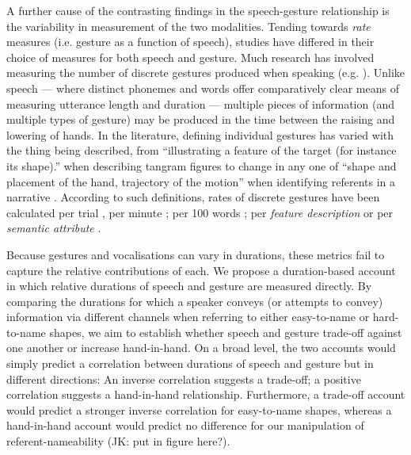 \documentclass[a4paper,man,natbib]{apa6}
\newcommand*{\term}[1]{\emph{#1}} %
\begin{document}
A further cause of the contrasting findings in the speech-gesture relationship is the variability in measurement of the two modalities.
Tending towards \term{rate} measures (i.e. gesture as a function of speech), studies have differed in their choice of measures for both speech and gesture.
Much research has involved measuring the number of discrete gestures produced when speaking (e.g. \citet{Hostetter2007, Gerwing2011, DeRuiter2012, Hoetjes2015}).
Unlike speech --- where distinct phonemes and words offer comparatively clear means of measuring utterance length and duration --- multiple pieces of information (and multiple types of gesture) may be produced in the time between the raising and lowering of hands.
In the literature, defining individual gestures has varied with the thing being described, from ``illustrating a feature of the target (for instance its shape).'' when describing tangram figures \citep{DeRuiter2012} to change in any one of ``shape and placement of the hand, trajectory of the motion'' when identifying referents in a narrative \citep{So2009}.
According to such definitions, rates of discrete gestures have been calculated per trial \citep{Morsella2004}, per minute \citep{Mol2011}; per 100 words \citep{Masson-Carro2015, Hostetter2007, Gerwing2011, Hoetjes2015}; per \term{feature description} \citep{DeRuiter2012} or per \term{semantic attribute} \citep{Hoetjes2015}.

Because gestures and vocalisations can vary in durations, these metrics fail to capture the relative contributions of each.
We propose a duration-based account in which relative durations of speech and gesture are measured directly.
By comparing the durations for which a speaker conveys (or attempts to convey) information via different channels when referring to either easy-to-name or hard-to-name shapes, we aim to establish whether speech and gesture trade-off against one another or increase hand-in-hand.
On a broad level, the two accounts would simply predict a correlation between durations of speech and gesture but in different directions: An inverse correlation suggests a trade-off; a positive correlation suggests a hand-in-hand relationship.
Furthermore, a trade-off account would predict a stronger inverse correlation for easy-to-name shapes, whereas a hand-in-hand account would predict no difference for our manipulation of referent-nameability (JK: put in figure here?).
\end{document}
